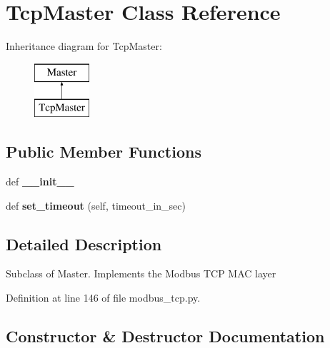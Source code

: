 \section{Tcp\+Master Class Reference}
\label{classprotolibs_1_1modbus__tk_1_1modbus__tcp_1_1_tcp_master}
Inheritance diagram for Tcp\+Master\+:\begin{figure}[H]
\begin{center}
\leavevmode
\includegraphics[height=2.000000cm]{classprotolibs_1_1modbus__tk_1_1modbus__tcp_1_1_tcp_master}
\end{center}
\end{figure}
\subsection*{Public Member Functions}
\begin{DoxyCompactItemize}
\item 
def {\bf \+\_\+\+\_\+init\+\_\+\+\_\+}
\item 
def {\bf set\+\_\+timeout} (self, timeout\+\_\+in\+\_\+sec)
\end{DoxyCompactItemize}


\subsection{Detailed Description}
\begin{DoxyVerb}Subclass of Master. Implements the Modbus TCP MAC layer\end{DoxyVerb}
 

Definition at line 146 of file modbus\+\_\+tcp.\+py.



\subsection{Constructor \& Destructor Documentation}
